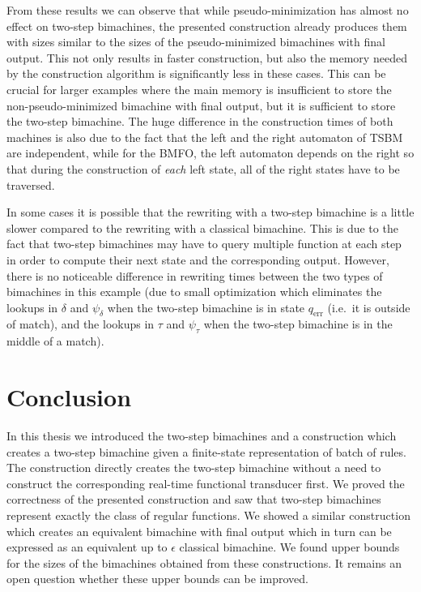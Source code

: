 \documentclass{article}
\begin{document}
	From these results we can observe that while pseudo-minimization has almost no effect on two-step bimachines, the presented construction already produces them with sizes similar to the sizes of the pseudo-minimized bimachines with final output. This not only results in faster construction, but also the memory needed by the construction algorithm is significantly less in these cases. This can be crucial for larger examples where the main memory is insufficient to store the non-pseudo-minimized bimachine with final output, but it is sufficient to store the two-step bimachine. The huge difference in the construction times of both machines is also due to the fact that the left and the right automaton of TSBM are independent, while for the BMFO, the left automaton depends on the right so that during the construction of \emph{each} left state, all of the right states have to be traversed.

	In some cases it is possible that the rewriting with a two-step bimachine is a little slower compared to the rewriting with a classical bimachine.
	This is due to the fact that two-step bimachines may have to query multiple function at each step in order to compute their next state and the corresponding output.
	However, there is no noticeable difference in rewriting times between the two types of bimachines in this example (due to small optimization which eliminates the lookups in $\delta$ and $\psi_\delta$ when the two-step bimachine is in state $q_\mathrm{err}$ (i.e.\ it is outside of match), and the lookups in $\tau$ and $\psi_\tau$ when the two-step bimachine is in the middle of a match).
	
	\section{Conclusion} \label{section:conclusion}
	In this thesis we introduced the two-step bimachines and a construction which creates a two-step bimachine given a finite-state representation of batch of rules. The construction directly creates the two-step bimachine without a need to construct the corresponding real-time functional transducer first.
	We proved the correctness of the presented construction and saw that two-step bimachines represent exactly the class of regular functions.
	We showed a similar construction which creates an equivalent bimachine with final output which in turn can be expressed as an equivalent up to $\epsilon$ classical bimachine.
	We found upper bounds for the sizes of the bimachines obtained from these constructions. It remains an open question whether these upper bounds can be improved.
	
\end{document}
